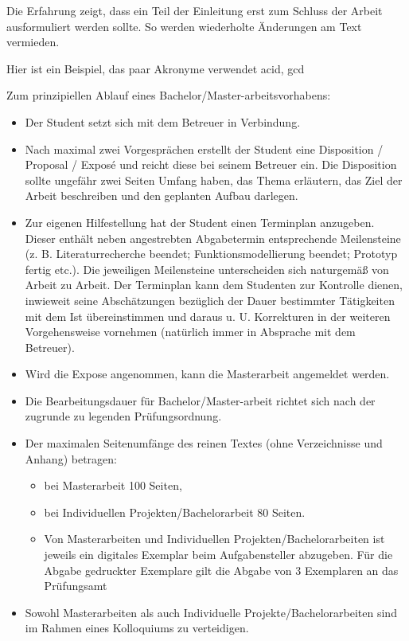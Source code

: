 \documentclass[11pt]{scrartcl}
\begin{document}
Die Erfahrung zeigt, dass ein Teil der Einleitung erst zum Schluss der Arbeit ausformuliert  werden sollte. So werden wiederholte Änderungen am Text vermieden.

Hier ist ein Beispiel, das paar Akronyme verwendet \acrshort{acid}, \acrshort{gcd}

Zum prinzipiellen Ablauf eines Bachelor/Master-arbeitsvorhabens:

\begin{itemize}
  \item Der Student setzt sich mit dem Betreuer in Verbindung.
  \item Nach maximal zwei Vorgesprächen erstellt der Student eine Disposition / Proposal / Exposé und reicht diese bei seinem Betreuer ein. Die Disposition sollte ungefähr zwei Seiten Umfang haben, das Thema erläutern, das Ziel der Arbeit beschreiben und den geplanten Aufbau darlegen.
  \item Zur eigenen Hilfestellung hat der Student einen Terminplan anzugeben. Dieser enthält neben angestrebten Abgabetermin entsprechende Meilensteine (z. B. Literaturrecherche beendet; Funktionsmodellierung beendet; Prototyp fertig etc.). Die jeweiligen Meilensteine unterscheiden sich naturgemäß von Arbeit zu Arbeit. Der Terminplan kann dem Studenten zur Kontrolle dienen, inwieweit seine Abschätzungen bezüglich der Dauer bestimmter Tätigkeiten mit dem Ist übereinstimmen und daraus u. U. Korrekturen in der weiteren Vorgehensweise vornehmen (natürlich immer in Absprache mit dem Betreuer).
  \item Wird die Expose angenommen, kann die Masterarbeit angemeldet werden.
  \item Die Bearbeitungsdauer für Bachelor/Master-arbeit  richtet sich nach der zugrunde zu legenden Prüfungsordnung.
  \item Der maximalen Seitenumfänge des reinen Textes (ohne Verzeichnisse und Anhang) betragen:
  \begin{itemize}
    \item bei Masterarbeit 100 Seiten,
    \item bei Individuellen Projekten/Bachelorarbeit 80 Seiten.
    \item Von Masterarbeiten und Individuellen Projekten/Bachelorarbeiten ist jeweils ein digitales Exemplar beim Aufgabensteller abzugeben. Für die Abgabe gedruckter Exemplare gilt die Abgabe von 3 Exemplaren an das Prüfungsamt
  \end{itemize}
  \item Sowohl Masterarbeiten als auch Individuelle Projekte/Bachelorarbeiten sind im Rahmen eines Kolloquiums zu verteidigen.
\end{itemize}
  
\end{document}
